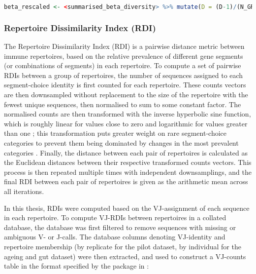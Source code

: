 \begin{lstlisting}[language=R]
beta_rescaled <- <summarised_beta_diversity> %>% mutate(D = (D-1)/(N_GROUP-1), D_UPPER = (D_UPPER-1)/(N_GROUP-1), D_LOWER = (D_LOWER-1)/(N_GROUP-1), D_SD = D_SD/(N_GROUP-1)) %>% select(-N_GROUP)
\end{lstlisting}

\subsubsection{Repertoire Dissimilarity Index (RDI)}
\label{sec:methods_comp_igdownstream_rdi}

The Repertoire Dissimilarity Index (RDI) \parencite{bolen2017rdi} is a pairwise distance metric between immune repertoires, based on the relative prevalence of different gene segments (or combinations of segments) in each repertoire. To compute a set of pairwise RDIs between a group of repertoires, the number of sequences assigned to each segment-choice identity is first counted for each repertoire. These counts vectors are then downsampled without replacement to the size of the repertoire with the fewest unique sequences, then normalised to sum to some constant factor. The normalised counts are then transformed with the inverse hyperbolic sine function, which is roughly linear for values close to zero and logarithmic for values greater than one \parencite{bolen2017rdi}; this transformation puts greater weight on rare segment-choice categories to prevent them being dominated by changes in the most prevalent categories \parencite{bolen2017rdi}. Finally, the distance between each pair of repertoires is calculated as the Euclidean distances between their respective transformed counts vectors. This process is then repeated multiple times with independent downsamplings, and the final RDI between each pair of repertoires is given as the arithmetic mean across all iterations.

In this thesis, RDIs were computed based on the VJ-assignment of each sequence in each repertoire. To compute VJ-RDIs between repertoires in a collated  database, the database was first filtered to remove sequences with missing or ambiguous V- or J-calls. The database columns denoting VJ-identity and repertoire membership (by replicate for the pilot dataset, by individual for the ageing and gut dataset) were then extracted, and used to construct a VJ-counts table in the format specified by the  package \parencite{bolen2017rdi} in :

